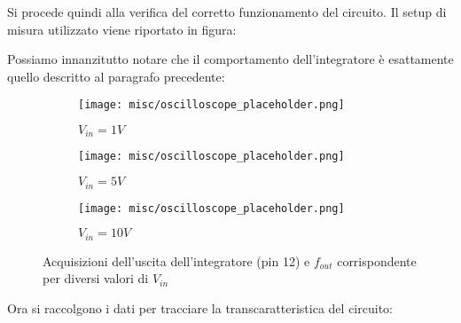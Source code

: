 
Si procede quindi alla verifica del corretto funzionamento del circuito. Il setup di
misura utilizzato viene riportato in figura:


Possiamo innanzitutto notare che il comportamento dell'integratore è esattamente quello
descritto al paragrafo precedente:

\begin{figure}[ht]
    \centering

    \begin{subfigure}{.5\textwidth}
        \centering
        \texttt{[image: misc/oscilloscope\_placeholder.png]}
        \caption{$V_{in}=1V$}
        \label{acq_vfc110_1v}
    \end{subfigure}%
    \begin{subfigure}{.5\textwidth}
        \centering
        \texttt{[image: misc/oscilloscope\_placeholder.png]}
        \caption{$V_{in}=5V$}
        \label{acq_vfc110_5v}
    \end{subfigure}
    \begin{subfigure}{.5\textwidth}
        \centering
        \texttt{[image: misc/oscilloscope\_placeholder.png]}
        \caption{$V_{in}=10V$}
        \label{acq_vfc110_10v}
    \end{subfigure}

    \caption{Acquisizioni dell'uscita dell'integratore (pin 12) e $f_{out}$ corrispondente
        per diversi valori di $V_{in}$}
    \label{acq_vfc110}
\end{figure}

Ora si raccolgono i dati per tracciare la transcaratteristica del circuito:


